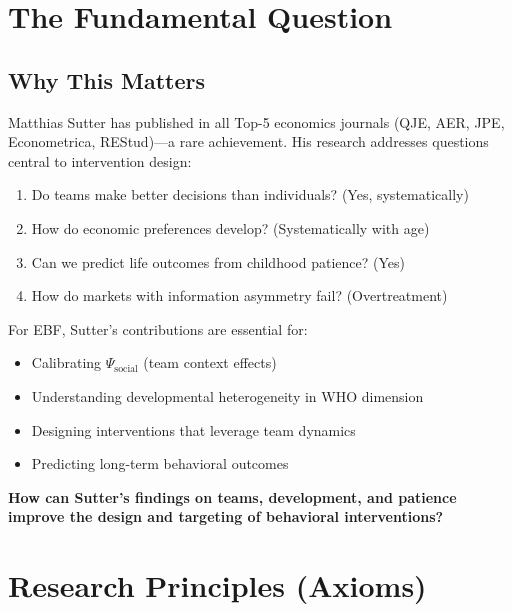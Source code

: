 \section{The Fundamental Question}
\label{sec:sut-fundamental}

\subsection{Why This Matters}

Matthias Sutter has published in all Top-5 economics journals (QJE, AER, JPE,
Econometrica, REStud)---a rare achievement. His research addresses questions
central to intervention design:

\begin{enumerate}
    \item Do teams make better decisions than individuals? (Yes, systematically)
    \item How do economic preferences develop? (Systematically with age)
    \item Can we predict life outcomes from childhood patience? (Yes)
    \item How do markets with information asymmetry fail? (Overtreatment)
\end{enumerate}

For EBF, Sutter's contributions are essential for:
\begin{itemize}[nosep]
    \item Calibrating $\Psi_{\text{social}}$ (team context effects)
    \item Understanding developmental heterogeneity in WHO dimension
    \item Designing interventions that leverage team dynamics
    \item Predicting long-term behavioral outcomes
\end{itemize}

\begin{tcolorbox}[colback=red!5!white, colframe=red!75!black,
    title=The Fundamental Question]
\textbf{How can Sutter's findings on teams, development, and patience improve
the design and targeting of behavioral interventions?}
\end{tcolorbox}


\section{Research Principles (Axioms)}
\label{sec:sut-axioms}

